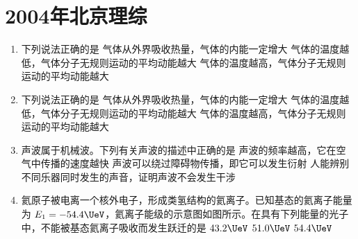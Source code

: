 \documentclass[\gkver]{gaokaozhenti}
\begin{document}
\chapter{2004年北京理综}

\begin{enumerate}
\item
下列说法正确的是
{气体从外界吸收热量，气体的内能一定增大}
{气体的温度越低，气体分子无规则运动的平均动能越大}
{气体的温度越高，气体分子无规则运动的平均动能越大}

\item
下列说法正确的是
{气体从外界吸收热量，气体的内能一定增大}
{气体的温度越低，气体分子无规则运动的平均动能越大}
{气体的温度越高，气体分子无规则运动的平均动能越大}

\item
声波属于机械波。下列有关声波的描述中正确的是
{声波的频率越高，它在空气中传播的速度越快}
{声波可以绕过障碍物传播，即它可以发生衍射}
{人能辨别不同乐器同时发生的声音，证明声波不会发生干涉}

\item
氦原子被电离一个核外电子，形成类氢结构的氦离子。已知基态的氦离子能量为 $E_{1}=-54.4\UeV$，氦离子能级的示意图如图所示。在具有下列能量的光子中，不能被基态氦离子吸收而发生跃迁的是
\fourchoices[answer=B]
{$40.8\UeV$}
{$43.2\UeV$}
{$51.0\UeV$}
{$54.4\UeV$}


\end{enumerate}
\end{document}
